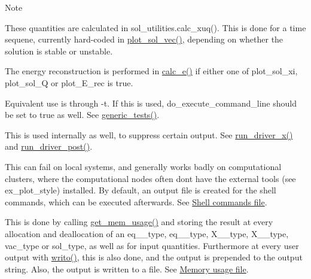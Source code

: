 \begin{DoxyNote}{Note}
\begin{DoxyEnumerate}
\item \label{page_inputs_fni26}%
%
These quantities are calculated in sol\+\_\+utilities.\+calc\+\_\+xuq(). This is done for a time sequene, currently hard-\/coded in \hyperlink{namespacesol__ops_ae14af60a6f8f77e7dde1e93dbaa7e6d0}{plot\+\_\+sol\+\_\+vec()}, depending on whether the solution is stable or unstable.
\item \label{page_inputs_fni27}%
%
The energy reconstruction is performed in \hyperlink{namespacesol__ops_aaeb4b122754fc6a4f538b22d72b6cba0}{calc\+\_\+e()} if either one of {\ttfamily plot\+\_\+sol\+\_\+xi}, {\ttfamily plot\+\_\+sol\+\_\+Q} or {\ttfamily plot\+\_\+\+E\+\_\+rec} is true.
\item \label{page_inputs_fni28}%
%
Equivalent use is through {\ttfamily -\/t}. If this is used, {\ttfamily do\+\_\+execute\+\_\+command\+\_\+line} should be set to true as well. See \hyperlink{namespacetest_aca21ee464c0b1f4b617177afdde110ec}{generic\+\_\+tests()}.
\item \label{page_inputs_fni29}%
%
This is used internally as well, to suppress certain output. See \hyperlink{namespacedriver__x_ada3d72a0929daaa5e3da585246d62281}{run\+\_\+driver\+\_\+x()} and \hyperlink{namespacedriver__post_a33b3c6f9018a0ddc92dce77394b8ab37}{run\+\_\+driver\+\_\+post()}.
\item \label{page_inputs_fni30}%
%
This can fail on local systems, and generally works badly on computational clusters, where the computational nodes often don\textquotesingle{}t have the external tools (see {\ttfamily ex\+\_\+plot\+\_\+style}) installed. By default, an output file is created for the shell commands, which can be executed afterwards. See \hyperlink{page_outputs_output_file_shell}{Shell commands file}.
\item \label{page_inputs_fni31}%
%
This is done by calling \hyperlink{namespacemessages_a82dddaab795b78b3d39e1ff1aab2f665}{get\+\_\+mem\+\_\+usage()} and storing the result at every allocation and deallocation of an {\ttfamily eq\+\_\+\_\+type}, {\ttfamily eq\+\_\+\_\+type}, {\ttfamily X\+\_\+\_\+type}, {\ttfamily X\+\_\+\_\+type}, {\ttfamily vac\+\_\+type} or {\ttfamily sol\+\_\+type}, as well as for input quantities. Furthermore at every user output with \hyperlink{namespacemessages_aa4a8d01563e92558e8a0875b075ec54c}{writo()}, this is also done, and the output is prepended to the output string. Also, the output is written to a file. See \hyperlink{page_outputs_output_file_mem}{Memory usage file}.

\end{DoxyEnumerate}
\end{DoxyNote}
